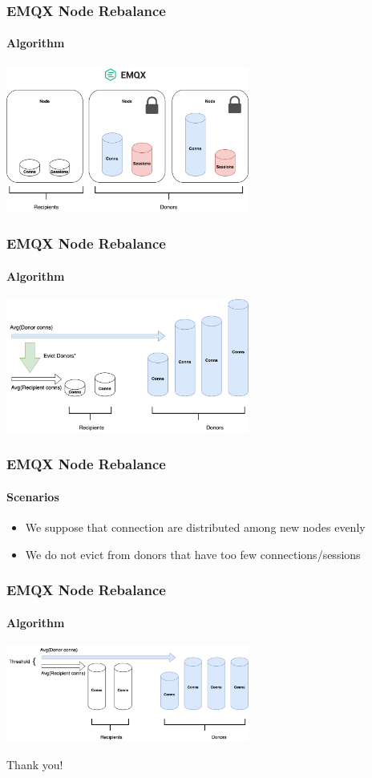 \documentclass{beamer}
\begin{document}
\begin{frame}
    \frametitle{EMQX Node Rebalance}
    \framesubtitle{Algorithm}
    \begin{center}
        \includegraphics[width=8cm, keepaspectratio]{images/node-rebalance-algo0.png}
    \end{center}
\end{frame}

\begin{frame}
    \frametitle{EMQX Node Rebalance}
    \framesubtitle{Algorithm}
    \begin{center}
        \includegraphics[width=8cm, keepaspectratio]{images/node-rebalance-algo1.png}
    \end{center}
\end{frame}

\begin{frame}
    \frametitle{EMQX Node Rebalance}
    \framesubtitle{Scenarios}
    \begin{itemize}
        \item We suppose that connection are distributed among new nodes evenly
        \item We do not evict from donors that have too few connections/sessions
    \end{itemize}
\end{frame}

\begin{frame}
    \frametitle{EMQX Node Rebalance}
    \framesubtitle{Algorithm}
    \begin{center}
        \includegraphics[width=8cm, keepaspectratio]{images/node-rebalance-algo2.png}
    \end{center}
\end{frame}

\begin{frame}
    \begin{center}
        Thank you!
    \end{center}
\end{frame}
\end{document}
